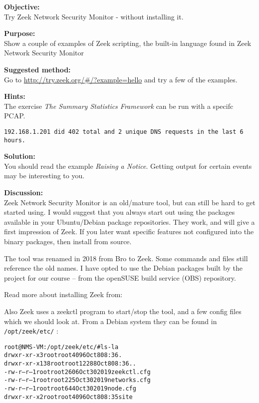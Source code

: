 \documentclass[a4paper,11pt,notitlepage]{report}
\begin{document}
{\bf Objective:} \\
Try Zeek Network Security Monitor - without installing it.


{\bf Purpose:}\\
Show a couple of examples of Zeek scripting, the built-in language found in Zeek Network Security Monitor


{\bf Suggested method:}\\
Go to \url{http://try.zeek.org/#/?example=hello} and try a few of the examples.

{\bf Hints:}\\
The exercise
\emph{The Summary Statistics Framework} can be run with a specifc PCAP.

\verb+192.168.1.201 did 402 total and 2 unique DNS requests in the last 6 hours.+

{\bf Solution:}\\
You should read the example \emph{Raising a Notice}. Getting output for certain events may be interesting to you.


{\bf Discussion:}\\
Zeek Network Security Monitor is an old/mature tool, but can still be hard to get started using. I would suggest that you always start out using the packages available in your Ubuntu/Debian package repositories.  They work, and will give a first impression of Zeek. If you later want specific features not configured into the binary packages, then install from source.

The tool was renamed in 2018 from Bro to Zeek. Some commands and files still reference the old names. I have opted to use the Debian packages built by the project for our course -- from the openSUSE build service (OBS) repository.

Read more about installing Zeek from: 

Also Zeek uses a zeekctl program to start/stop the tool, and a few config files which we should look at. From a Debian system they can be found in \verb+/opt/zeek/etc/+ :

\begin{alltt}
root@NMS-VM:/opt/zeek/etc/# ls -la
drwxr-xr-x   3 root root  4096 Oct  8 08:36 .
drwxr-xr-x 138 root root 12288 Oct  8 08:36 ..
-rw-r--r--   1 root root  2606 Oct 30  2019 zeekctl.cfg
-rw-r--r--   1 root root   225 Oct 30  2019 networks.cfg
-rw-r--r--   1 root root   644 Oct 30  2019 node.cfg
drwxr-xr-x   2 root root  4096 Oct  8 08:35 site
\end{alltt}
\end{document}
